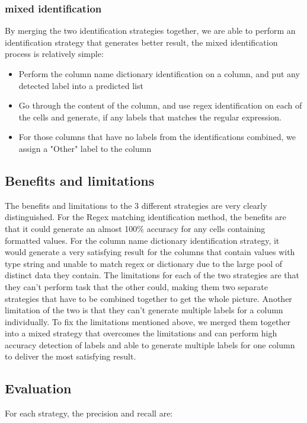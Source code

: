 \documentclass[sigconf]{acmart}
\begin{document}
\subsubsection{mixed identification}
By merging the two identification strategies together, we are able to perform an identification strategy that generates better result, the mixed identification process is relatively simple:
\begin{itemize}
\item Perform the column name dictionary identification on a column, and put any detected label into a predicted list
\item Go through the content of the column, and use regex identification on each of the cells and generate, if any labels that matches the regular expression.
\item For those columns that have no labels from the identifications combined, we assign a "Other" label to the column
\end{itemize}
\subsection{Benefits and limitations}
The benefits and limitations to the 3 different strategies are very clearly distinguished. For the Regex matching identification method, the benefits are that it could generate an almost 100\% accuracy for any cells containing formatted values. 
For the column name dictionary identification strategy, it would generate a very satisfying result for the columns that contain values with type string and unable to match regex or dictionary due to the large pool of distinct data they contain.
The limitations for each of the two strategies are that they can't perform task that the other could, making them two separate strategies that have to be combined together to get the whole picture. Another limitation of the two is that they can't generate multiple labels for a column individually.
To fix the limitations mentioned above, we merged them together into a mixed strategy that overcomes the limitations and can perform high accuracy detection of labels and able to generate multiple labels for one column to deliver the most satisfying result.
\subsection{Evaluation}
For each strategy, the precision and recall are:
\end{document}
